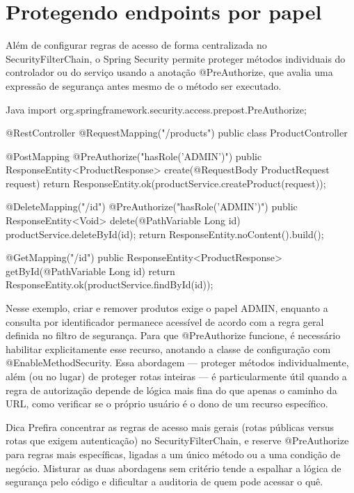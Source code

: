 \section{Protegendo endpoints por papel}

Além de configurar regras de acesso de forma centralizada no SecurityFilterChain, o Spring Security permite proteger métodos individuais do controlador ou do serviço usando a anotação @PreAuthorize, que avalia uma expressão de segurança antes mesmo de o método ser executado.

\begin{codebox}{Java}
 import org.springframework.security.access.prepost.PreAuthorize;

 @RestController
 @RequestMapping("/products")
 public class ProductController {

        @PostMapping
        @PreAuthorize("hasRole('ADMIN')")
        public ResponseEntity<ProductResponse> create(@RequestBody ProductRequest 
          request) {
            return ResponseEntity.ok(productService.createProduct(request));
        }

        @DeleteMapping("/{id}")
        @PreAuthorize("hasRole('ADMIN')")
        public ResponseEntity<Void> delete(@PathVariable Long id) {
            productService.deleteById(id);
            return ResponseEntity.noContent().build();
        }

        @GetMapping("/{id}")
        public ResponseEntity<ProductResponse> getById(@PathVariable Long id) {
            return ResponseEntity.ok(productService.findById(id));
        }
 }
\end{codebox}

Nesse exemplo, criar e remover produtos exige o papel ADMIN, enquanto a consulta por identificador permanece acessível de acordo com a regra geral definida no filtro de segurança. Para que @PreAuthorize funcione, é necessário habilitar explicitamente esse recurso, anotando a classe de configuração com @EnableMethodSecurity. Essa abordagem — proteger métodos individualmente, além (ou no lugar) de proteger rotas inteiras — é particularmente útil quando a regra de autorização depende de lógica mais fina do que apenas o caminho da URL, como verificar se o próprio usuário é o dono de um recurso específico.

\begin{infobox}{Dica}
Prefira concentrar as regras de acesso mais gerais (rotas públicas versus rotas que exigem autenticação) no SecurityFilterChain, e reserve @PreAuthorize para regras mais específicas, ligadas a um único método ou a uma condição de negócio. Misturar as duas abordagens sem critério tende a espalhar a lógica de segurança pelo código e dificultar a auditoria de quem pode acessar o quê.
\end{infobox}

